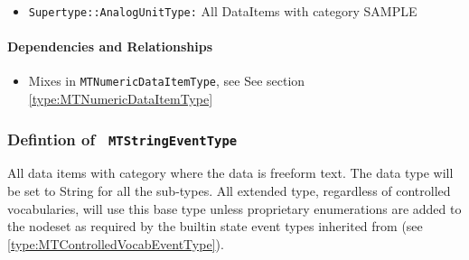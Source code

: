 \begin{itemize}
\item \texttt{Supertype::AnalogUnitType:} All DataItems with category SAMPLE

\end{itemize}
\paragraph{Dependencies and Relationships}

\begin{itemize}
\item Mixes in \texttt{MTNumericDataItemType}, see See section \ref{type:MTNumericDataItemType}
\end{itemize}
\FloatBarrier
\subsubsection{Defintion of \texttt{ MTStringEventType}}
  \label{type:MTStringEventType}

\FloatBarrier

All data items with \gls{category}  where the data is freeform text. The data type
will be set to String for all the sub-types. All extended type, regardless of 
controlled vocabularies, will use this base type unless proprietary 
enumerations are added to the nodeset as required by the builtin state
event types inherited from  (see \ref{type:MTControlledVocabEventType}).

